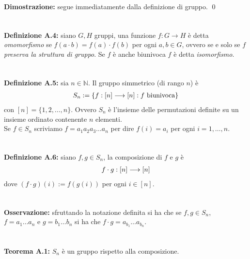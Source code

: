 \documentclass{article}
\begin{document}
\textbf{Dimostrazione:} segue immediatamente dalla definizione di gruppo. \qed \\ \\ \\
\textbf{Definizione A.4:} siano $G, H$ gruppi, una funzione $f : G \longrightarrow H$ è detta \textit{omomorfismo} se $f(a \cdot b) = f(a) \cdot f(b)$ per ogni $a, b \in G$, ovvero se e solo se $f$ \textit{preserva la struttura di gruppo}. Se $f$ è anche biunivoca $f$ è detta \textit{isomorfismo}. \\ \\ \\
\textbf{Definizione A.5:} sia $n \in \mathbb{N}$. Il gruppo simmetrico (di rango $n$) è
\begin{gather}
    S_n := \{ f : [n] \longrightarrow [n] : f \text{ biunivoca} \} \notag
\end{gather}
con $[n] = \{1, 2, \dots, n \}$. Ovvero $S_n$ è l'insieme delle permutazioni definite su un insieme ordinato contenente $n$ elementi. \\
Se $f \in S_n$ scriviamo $f = a_1a_2a_3 \dots a_n$ per dire $f(i) = a_i$ per ogni $i = 1, \dots, n$. \\ \\ \\
\textbf{Definizione A.6:} siano $f, g \in S_n$, la composizione di $f$ e $g$ è
\begin{gather}
    f \cdot g : [n] \longrightarrow [n] \notag
\end{gather}
dove $(f \cdot g) (i) := f(g(i))$ per ogni $i \in [n]$. \\ \\ \\
\textbf{Osservazione:} sfruttando la notazione definita si ha che se $f, g \in S_n$, \\ $f = a_1 \dots a_n$ e $g = b_1 \dots b_n$ si ha che $f \cdot g = a_{b_1} \dots a_{b_n}$. \\ \\ \\
\textbf{Teorema A.1:} $S_n$ è un gruppo rispetto alla composizione. \\
\end{document}
